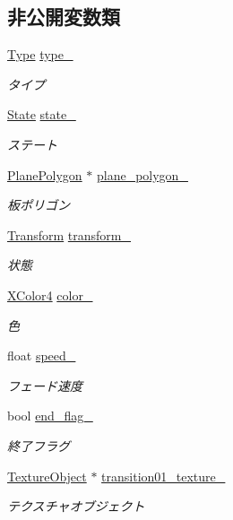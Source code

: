 \subsection*{非公開変数類}
\begin{DoxyCompactItemize}
\item 
\mbox{\hyperlink{class_fade_ac06f27215b454aa05b93c236476d6e80}{Type}} \mbox{\hyperlink{class_fade_a1d04a65762c863a1d3571f0e1d47532a}{type\+\_\+}}
\begin{DoxyCompactList}\small\item\em タイプ \end{DoxyCompactList}\item 
\mbox{\hyperlink{class_fade_ae77826bf3ff2ab95fb7b3b6f95cba80a}{State}} \mbox{\hyperlink{class_fade_ad5ff5a5645edb88fd5544819077ff13f}{state\+\_\+}}
\begin{DoxyCompactList}\small\item\em ステート \end{DoxyCompactList}\item 
\mbox{\hyperlink{class_plane_polygon}{Plane\+Polygon}} $\ast$ \mbox{\hyperlink{class_fade_ab51b04ff5e6225016ccb012fce80dd74}{plane\+\_\+polygon\+\_\+}}
\begin{DoxyCompactList}\small\item\em 板ポリゴン \end{DoxyCompactList}\item 
\mbox{\hyperlink{class_transform}{Transform}} \mbox{\hyperlink{class_fade_a3b94f7f5317c98e1db1cc17346313626}{transform\+\_\+}}
\begin{DoxyCompactList}\small\item\em 状態 \end{DoxyCompactList}\item 
\mbox{\hyperlink{_vector3_d_8h_a680c30c4a07d86fe763c7e01169cd6cc}{X\+Color4}} \mbox{\hyperlink{class_fade_af3b40978f7e38980379c9189aadcf310}{color\+\_\+}}
\begin{DoxyCompactList}\small\item\em 色 \end{DoxyCompactList}\item 
float \mbox{\hyperlink{class_fade_af46cade81dd992a5d8a0fe241aefd8b2}{speed\+\_\+}}
\begin{DoxyCompactList}\small\item\em フェード速度 \end{DoxyCompactList}\item 
bool \mbox{\hyperlink{class_fade_aeeddfe04f4dc156f2f4f0db903bb7fa1}{end\+\_\+flag\+\_\+}}
\begin{DoxyCompactList}\small\item\em 終了フラグ \end{DoxyCompactList}\item 
\mbox{\hyperlink{class_texture_object}{Texture\+Object}} $\ast$ \mbox{\hyperlink{class_fade_a4ff29d821f15a33e2110acc03c8d8a84}{transition01\+\_\+texture\+\_\+}}
\begin{DoxyCompactList}\small\item\em テクスチャオブジェクト \end{DoxyCompactList}\end{DoxyCompactItemize}


